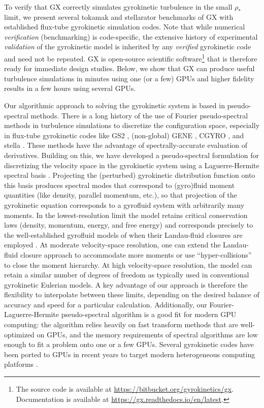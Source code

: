 \documentclass{jpp}
\newcommand{\GX}{{GX}\xspace}
\begin{document}
To verify that \GX correctly simulates gyrokinetic turbulence in the small $\rho_*$ limit, we present several tokamak and stellarator benchmarks of \GX with established flux-tube gyrokinetic simulation codes.
Note that while numerical {\it verification} (benchmarking) is code-specific, the extensive history of experimental {\it validation} of the gyrokinetic model is inherited by any \emph{verified} gyrokinetic code and need not be repeated. \GX is open-source scientific software\footnote{The source code is available at \url{https://bitbucket.org/gyrokinetics/gx}. Documentation is available at \url{https://gx.readthedocs.io/en/latest}.} that is therefore ready for immediate design studies. Below, we show that \GX can produce useful turbulence simulations in minutes using one (or a few) GPUs {\color{black} and higher fidelity results in a few hours using several GPUs}. 
 

Our algorithmic approach to solving the gyrokinetic system is based in pseudo-spectral methods. There is a long history of the use of Fourier pseudo-spectral methods in turbulence simulations to discretize the configuration space, especially in flux-tube gyrokinetic codes like GS2 \citep{kotschenreuther1995,dorland2000}, (non-global) GENE \citep{jenko2001}, CGYRO \citep{Candy2016}, and stella \citep{Barnes2019}. These methods have the advantage of spectrally-accurate evaluation of derivatives. Building on this, we have developed a pseudo-spectral formulation for discretizing the velocity space in the gyrokinetic system using a Laguerre-Hermite spectral basis \citep{Mandell2018}. Projecting the {\color{black}(perturbed)} gyrokinetic distribution function onto this basis produces spectral modes that correspond to (gyro)fluid moment quantities (like density, parallel momentum, etc.), so that projection of the gyrokinetic equation corresponds to a gyrofluid system with arbitrarily many moments. In the lowest-resolution limit the model retains critical conservation laws (density, momentum, energy, and free energy) and corresponds precisely to the well-established gyrofluid models of \citet{Dorland1993,Beer1996,Snyder2001} {\color{black} when their Landau-fluid closures are employed \citep{Hammett1990,Beer1996}. At moderate velocity-space resolution, one can extend the Landau-fluid closure approach to accommodate more moments \citep{Smith1997}} or use ``hyper-collisions'' to close the moment hierarchy. At high velocity-space resolution, the model {\color{black} can retain a similar number of degrees of freedom as typically used in} conventional gyrokinetic Eulerian models. A key advantage of our approach is therefore the flexibility to interpolate between these limits, depending on the desired balance of accuracy and speed for a particular calculation.  Additionally, our Fourier-Laguerre-Hermite pseudo-spectral algorithm is a good fit for modern GPU computing: the algorithm relies heavily on fast transform methods that are well-optimized on GPUs, and the memory requirements of spectral algorithms are low enough to fit a problem onto one or a few GPUs. {\color{black} Several gyrokinetic codes have  been ported to GPUs in recent years to target modern heterogeneous computing platforms \citep{Madduri2011,DAzevedo2018,Sfiligoi2018,Belli2022,Germaschewski2021,Ohana2021}.}
\end{document}
